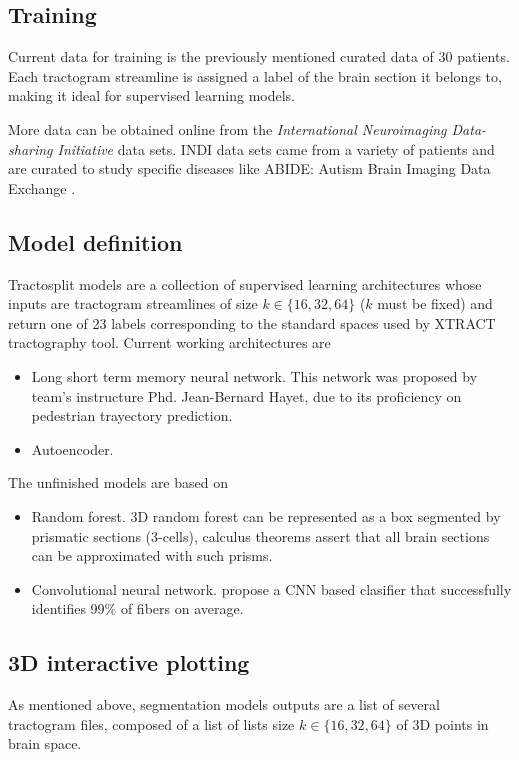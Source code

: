 \documentclass[conference]{IEEEtran}
\begin{document}
\subsection{Training}
Current data for training is the previously mentioned curated data of 30 patients. Each tractogram streamline is assigned a label of the brain section it belongs to, making it ideal for supervised learning models.

More data can be obtained online from the \textit{International Neuroimaging Data-sharing Initiative} \cite{b3} data sets. INDI data sets came from a variety of patients and are curated to study specific diseases like ABIDE: Autism Brain Imaging Data Exchange \cite{b4}.

\subsection{Model definition}
Tractosplit models are a collection of supervised learning architectures whose inputs are tractogram streamlines of size $k\in\{16, 32, 64\}$ ($k$ must be fixed) and return one of 23 labels corresponding to the standard spaces used by XTRACT \cite{b4} tractography tool. Current working architectures are

\begin{itemize}
    \item Long short term memory neural network. This network was proposed by team's instructure Phd. Jean-Bernard Hayet, due to its proficiency on pedestrian trayectory prediction.
    \item Autoencoder.
\end{itemize}
The unfinished models are based on
\begin{itemize}
    \item Random forest. 3D random forest can be represented as a box segmented by prismatic sections (3-cells), calculus theorems assert that all brain sections can be approximated with such prisms.
    \item Convolutional neural network. \cite{b5} propose a CNN based clasifier that successfully identifies 99\% of fibers on average.
\end{itemize}

\subsection{3D interactive plotting}
As mentioned above, segmentation models outputs are a list of several tractogram files, composed of a list of lists size $k\in \{16, 32, 64\}$ of 3D points in brain space.
\end{document}
